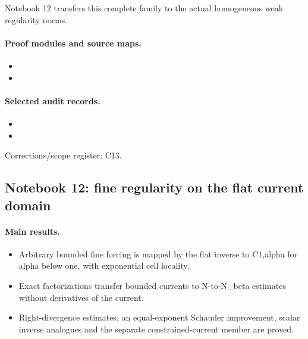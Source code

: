 \documentclass[11pt]{article}
\theoremstyle{remark}
\begin{document}
Notebook 12 transfers this complete family to the actual homogeneous weak regularity norms.

\paragraph{Proof modules and source maps.}
\begingroup\small
\begin{itemize}
\item {}
\item {}
\end{itemize}
\endgroup

\paragraph{Selected audit records.}
\begingroup\small
\begin{itemize}
\item {}
\item {}
\end{itemize}
\endgroup
Corrections/scope register: C13.\par

\subsection{Notebook 12: fine regularity on the flat current domain}
\label{hnc-12}
\noindent{}\par

\paragraph{Main results.}
\begin{itemize}
\item Arbitrary bounded fine forcing is mapped by the flat inverse to C1,alpha for alpha below one, with exponential cell locality.
\item Exact factorizations transfer bounded currents to N-to-N\_beta estimates without derivatives of the current.
\item Right-divergence estimates, an equal-exponent Schauder improvement, scalar inverse analogues and the separate constrained-current member are proved.
\end{itemize}
\end{document}
